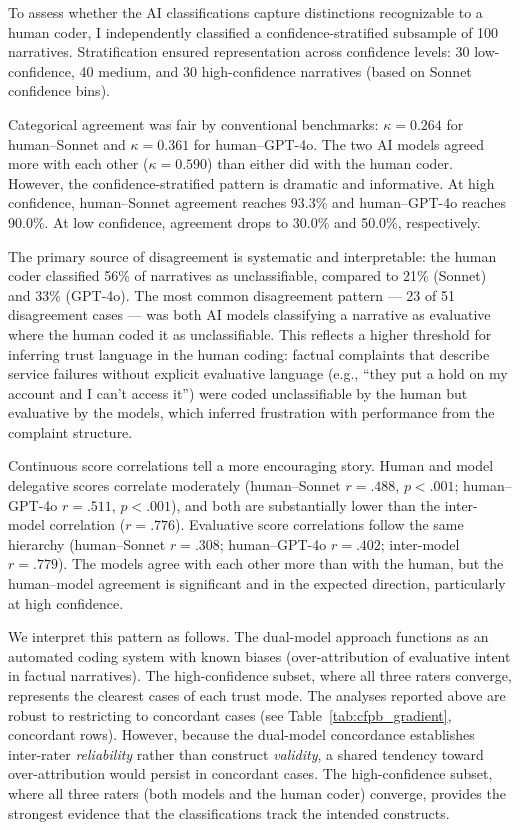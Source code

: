 To assess whether the AI classifications capture distinctions recognizable to a human coder, I independently classified a confidence-stratified subsample of 100 narratives. Stratification ensured representation across confidence levels: 30 low-confidence, 40 medium, and 30 high-confidence narratives (based on Sonnet confidence bins).

Categorical agreement was fair by conventional benchmarks: $\kappa = 0.264$ for human--Sonnet and $\kappa = 0.361$ for human--GPT-4o. The two AI models agreed more with each other ($\kappa = 0.590$) than either did with the human coder. However, the confidence-stratified pattern is dramatic and informative. At high confidence, human--Sonnet agreement reaches 93.3\% and human--GPT-4o reaches 90.0\%. At low confidence, agreement drops to 30.0\% and 50.0\%, respectively.

The primary source of disagreement is systematic and interpretable: the human coder classified 56\% of narratives as unclassifiable, compared to 21\% (Sonnet) and 33\% (GPT-4o). The most common disagreement pattern --- 23 of 51 disagreement cases --- was both AI models classifying a narrative as evaluative where the human coded it as unclassifiable. This reflects a higher threshold for inferring trust language in the human coding: factual complaints that describe service failures without explicit evaluative language (e.g., ``they put a hold on my account and I can't access it'') were coded unclassifiable by the human but evaluative by the models, which inferred frustration with performance from the complaint structure.

Continuous score correlations tell a more encouraging story. Human and model delegative scores correlate moderately (human--Sonnet $r = .488$, $p < .001$; human--GPT-4o $r = .511$, $p < .001$), and both are substantially lower than the inter-model correlation ($r = .776$). Evaluative score correlations follow the same hierarchy (human--Sonnet $r = .308$; human--GPT-4o $r = .402$; inter-model $r = .779$). The models agree with each other more than with the human, but the human--model agreement is significant and in the expected direction, particularly at high confidence.

We interpret this pattern as follows. The dual-model approach functions as an automated coding system with known biases (over-attribution of evaluative intent in factual narratives). The high-confidence subset, where all three raters converge, represents the clearest cases of each trust mode. The analyses reported above are robust to restricting to concordant cases (see Table~\ref{tab:cfpb_gradient}, concordant rows). However, because the dual-model concordance establishes inter-rater \emph{reliability} rather than construct \emph{validity}, a shared tendency toward over-attribution would persist in concordant cases. The high-confidence subset, where all three raters (both models and the human coder) converge, provides the strongest evidence that the classifications track the intended constructs.

